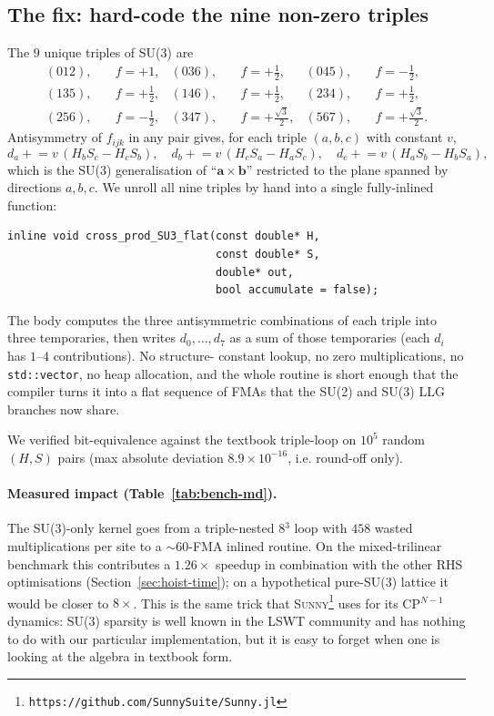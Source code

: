 \documentclass[11pt,letterpaper]{article}
\begin{document}
\subsection{The fix: hard-code the nine non-zero triples}
The $9$ unique triples of SU(3) are
\[
\begin{aligned}
   (012),&\quad f = +1, & (036),&\quad f = +\tfrac12, & (045),&\quad f = -\tfrac12, \\
   (135),&\quad f = +\tfrac12, & (146),&\quad f = +\tfrac12, & (234),&\quad f = +\tfrac12, \\
   (256),&\quad f = -\tfrac12, & (347),&\quad f = +\tfrac{\sqrt 3}{2}, & (567),&\quad f = +\tfrac{\sqrt 3}{2}.
\end{aligned}
\]
Antisymmetry of $f_{ijk}$ in any pair gives, for each triple
$(a,b,c)$ with constant $v$,
\[
   d_a \mathrel{+}= v\,(H_b S_c - H_c S_b),\quad
   d_b \mathrel{+}= v\,(H_c S_a - H_a S_c),\quad
   d_c \mathrel{+}= v\,(H_a S_b - H_b S_a),
\]
which is the SU(3) generalisation of ``$\mathbf{a} \times \mathbf{b}$''
restricted to the plane spanned by directions $a,b,c$.  We unroll all
nine triples by hand into a single fully-inlined function:
\begin{lstlisting}
inline void cross_prod_SU3_flat(const double* H,
                                const double* S,
                                double* out,
                                bool accumulate = false);
\end{lstlisting}
The body computes the three antisymmetric combinations of each triple
into three temporaries, then writes $d_0,\dots,d_7$ as a sum of those
temporaries (each $d_i$ has $1$--$4$ contributions).  No structure-
constant lookup, no zero multiplications, no \texttt{std::vector}, no
heap allocation, and the whole routine is short enough that the
compiler turns it into a flat sequence of FMAs that the SU(2) and SU(3)
LLG branches now share.

We verified bit-equivalence against the textbook triple-loop on
$10^{5}$ random $(H, S)$ pairs (max absolute deviation $8.9\times
10^{-16}$, i.e. round-off only).

\paragraph{Measured impact (Table~\ref{tab:bench-md}).}
The SU(3)-only kernel goes from a triple-nested 8\(^3\) loop with $458$
wasted multiplications per site to a $\sim 60$-FMA inlined routine.
On the mixed-trilinear benchmark this contributes a $1.26\times$
speedup in combination with the other RHS optimisations
(Section~\ref{sec:hoist-time}); on a hypothetical pure-SU(3) lattice
it would be closer to $8\times$.  This is the same trick that
\textsc{Sunny}\footnote{\texttt{https://github.com/SunnySuite/Sunny.jl}}
uses for its CP$^{N{-}1}$ dynamics: SU(3) sparsity is well known in the
LSWT community and has nothing to do with our particular
implementation, but it is easy to forget when one is looking at the
algebra in textbook form.
\end{document}
